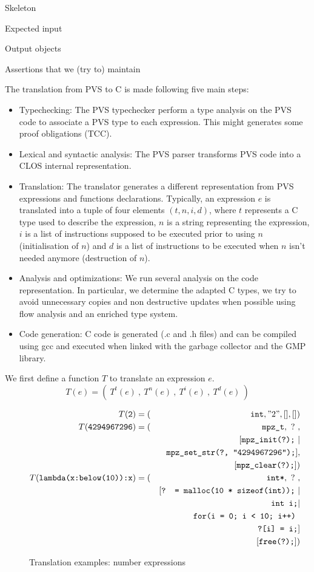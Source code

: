 \documentclass[12pt,a4paper,titlepage]{article}
\newcommand{\cl}[1]{\texttt{#1}}
\begin{document}
Skeleton

Expected input

Output objects

Assertions that we (try to) maintain


The translation from PVS to C is made following five main steps:
\begin{itemize}
\item Typechecking: The PVS typechecker perform a type analysis on the PVS code to associate a PVS type to each expression. This might generates some proof obligations (TCC).
\item Lexical and syntactic analysis: The PVS parser transforms PVS code into a CLOS internal representation.
\item Translation: The translator generates a different representation from PVS expressions and functions declarations.
Typically, an expression $e$ is translated into a tuple of four elements $(t,n,i,d)$, where $t$ represents a C type used to describe the expression, $n$ is a string representing the expression, $i$ is a list of instructions supposed to be executed prior to using $n$ (initialisation of $n$) and $d$ is a list of instructions to be executed when $n$ isn't needed anymore (destruction of $n$).
\item Analysis and optimizations: We run several analysis on the code representation. In particular, we determine the adapted C types, we try to avoid unnecessary copies and non destructive updates when possible using flow analysis and an enriched type system.
\item Code generation: C code is generated (.c and .h files) and can be compiled using gcc and executed when linked with the garbage collector and the GMP library. 
\end{itemize}

We first define a function $T$ to translate an expression $e$.
$$ T(e) = ( \ T^t(e) \ , \ T^n(e) \ , \ T^i(e) \ , \ T^d(e) \ ) $$

\begin{figure}[h!]
\begin{eqnarray*}
T(\cl{2}) &= (& \cl{int}, "2", [], []) \\
T(\cl{4294967296}) &= (& \cl{mpz\_t}, \ ? \ , \\
&& [ \cl{mpz\_init(?);} \ | \\
&& \ \cl{mpz\_set\_str(?, "4294967296");} ],\\
&& [ \cl{mpz\_clear(?);} ]) \\
T(\cl{lambda(x:below(10)):x}) &= (& \cl{int*}, \ ? \ , \\
&& [ \cl{? = malloc(10 * sizeof(int));} \ | \\
&& \ \cl{int i;} | \\
&& \ \cl{for(i = 0; i < 10; i++) }\\
&& \ \ \ \cl{?[i] = i;}  ]\\
&& [ \cl{free(?);} ])
\end{eqnarray*}
\caption{Translation examples: number expressions}
\end{figure}
\end{document}
